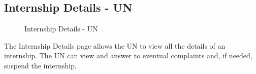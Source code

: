 \subsection{Internship Details - UN}
\label{subsec:internship-details-un}%

\begin{figure}[H]
    \centering
    \caption{Internship Details - UN}
    \label{fig:internship-details-un}
\end{figure}

\par The Internship Details page allows the UN to view all the details of an internship. The UN can view and answer to
eventual complaints and, if needed, suspend the internship.
